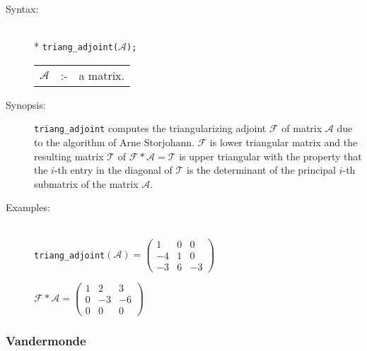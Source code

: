 \begin{description}
\item[Syntax:]\mbox{}\\*
\texttt{triang\_adjoint($\mathcal{A}$);}\\[2mm]
\begin{tabular}{l l l}
$\mathcal{A}$  &:-& a matrix.
\end{tabular}

\item[Synopsis:]

\texttt{triang\_adjoint} computes the triangularizing adjoint $\mathcal{F}$ of
matrix $\mathcal{A}$ due to the algorithm of Arne Storjohann. $\mathcal{F}$ is
lower triangular matrix and the resulting matrix $\mathcal{T}$ of
$\mathcal{F * A = T}$ is upper triangular with the property that the $i$-th
entry in the diagonal of $\mathcal{T}$ is the determinant of the principal
$i$-th submatrix of the matrix $\mathcal{A}$.

\item[Examples:]\mbox{}\\
  \texttt{triang\_adjoint}\((\mathcal{A}) =
  \begin{pmatrix} 1 & 0 & 0 \\ -4 & 1 & 0 \\ -3 & 6 & -3 \end{pmatrix}\)

  \(\mathcal{F} * \mathcal{A} =
  \begin{pmatrix} 1 & 2 & 3 \\ 0 & -3 & -6 \\ 0 & 0 & 0 \end{pmatrix}\)
\end{description}

\subsubsection{Vandermonde}
\label{linalg:Vandermonde}
\hypertarget{operator:VANDERMONDE}{}

